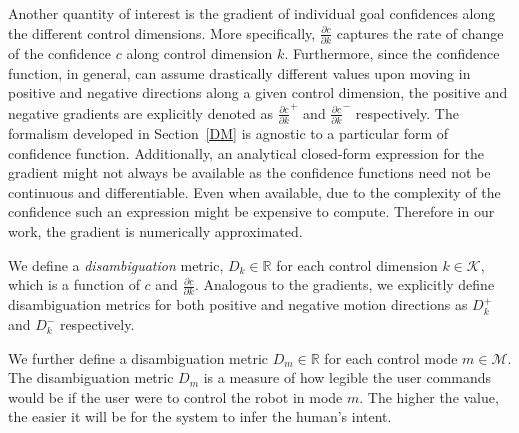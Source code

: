 \documentclass[conference]{IEEEtran}
\begin{document}
Another quantity of interest is the gradient of individual goal confidences along the different control dimensions. More specifically, $\frac{\partial c}{\partial k}$ captures the rate of change of the confidence $c$ along control dimension $k$. Furthermore, since the confidence function, in general, can assume drastically different values upon moving in positive and negative directions along a  given control dimension, the positive and negative gradients are explicitly denoted as $\frac{\partial c}{\partial k}^{+}$ and $\frac{\partial c}{\partial k}^{-}$ respectively. The formalism developed in Section~\ref{DM} is agnostic to a particular form of confidence function. Additionally, an analytical closed-form expression for the gradient might not always be available as the confidence functions need not be continuous and differentiable. Even when available, due to the complexity of the confidence such an expression might be expensive to compute. Therefore in our work, the gradient is numerically approximated.

We define a \textit{disambiguation} metric, $D_{k}\in \mathbb{R}$ for each control dimension $k \in \mathcal{K}$, which is a function of $c$ and $\frac{\partial c}{\partial k}$. Analogous to the gradients, we explicitly define disambiguation metrics for both positive and negative motion directions as $D_{k}^{+}$ and $D_{k}^{-}$ respectively.

We further define a disambiguation metric $D_m \in \mathbb{R}$ for each control mode $m \in \mathcal{M}$.
The disambiguation metric $D_m$ is a measure of how legible the user commands would be if the user were to control the robot in mode $m$. The higher the value, the easier it will be for the system to infer the human's intent. 
\end{document}
